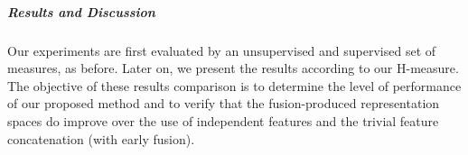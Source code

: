 %



\subparagraph{Results and Discussion}
Our experiments are first evaluated by an unsupervised and supervised set of measures, as before. Later on, we present the results according to our H-measure. The objective of these results comparison is to determine the level of performance of our proposed method and to verify that the fusion-produced representation spaces do improve over the use of independent features and the trivial feature concatenation (with early fusion).




